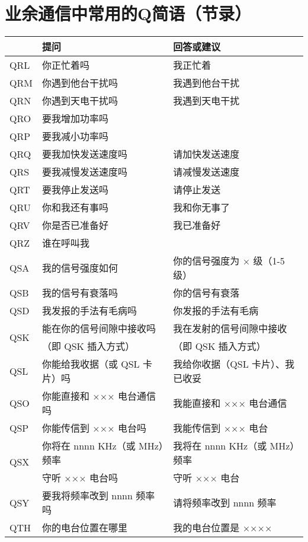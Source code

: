 \newpage

\section{业余通信中常用的Q简语（节录）}

\begin{longtable}{|l|l|l|}
	\hline
	 & \textbf{提问} & \textbf{回答或建议} \\
	\hline
	QRL & 你正忙着吗 & 我正忙着 \\
	\hline
	QRM & 你遇到他台干扰吗 & 我遇到他台干扰 \\
	\hline
	QRN & 你遇到天电干扰吗 & 我遇到天电干扰 \\
	\hline
	QRO & 要我增加功率吗 & \\
	\hline
	QRP & 要我减小功率吗 & \\
	\hline
	QRQ & 要我加快发送速度吗 & 请加快发送速度 \\
	\hline
	QRS & 要我减慢发送速度吗 & 请减慢发送速度 \\
	\hline
	QRT & 要我停止发送吗 & 请停止发送 \\
	\hline
	QRU & 你和我还有事吗 & 我和你无事了 \\
	\hline
	QRV & 你是否已准备好 & 我已准备好 \\
	\hline
	QRZ & 谁在呼叫我 & \\
	\hline
	QSA & 我的信号强度如何 & 你的信号强度为 × 级（1-5 级） \\
	\hline
	QSB & 我的信号有衰落吗 & 你的信号有衰落 \\
	\hline
	QSD & 我发报的手法有毛病吗 & 你发报的手法有毛病 \\
	\hline
	\multirow{2}{1em}{QSK} & 能在你的信号间隙中接收吗 & 我在发射的信号间隙中接收 \\
	& （即 QSK 插入方式）    & （即 QSK 插入方式） \\
	\hline
	QSL & 你能给我收据（或 QSL 卡片）吗 & 我给你收据（QSL 卡片）、我已收妥 \\
	\hline
	QSO & 你能直接和 ××× 电台通信吗 & 我能直接和 ××× 电台通信 \\
	\hline
	QSP & 你能传信到 ××× 电台吗 & 我能传信到 ××× 电台 \\
	\hline
	\multirow{2}{1em}{QSX} & 你将在 nnnn KHz（或 MHz）频率 & 我将在 nnnn KHz（或 MHz）频率 \\
	    & 守听 ××× 电台吗 & 守听 ××× 电台 \\
	\hline
	QSY & 要我将频率改到 nnnn 频率吗 & 请将频率改到 nnnn 频率 \\
	\hline
	QTH & 你的电台位置在哪里 & 我的电台位置是 ×××× \\
	\hline
\end{longtable}


